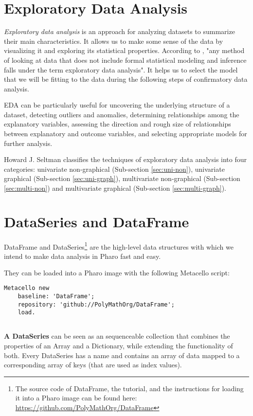 \documentclass[sigplan]{acmart}
\begin{document}
\section{Exploratory Data Analysis}
\label{sec:eda}
\textit{Exploratory data analysis} is an approach for analyzing datasets to summarize their main characteristics. It allows us to make some sense of the data by visualizing it and exploring its statistical properties.
According to \cite{Seltman}, "any method of looking at data that does not include formal statistical modeling and inference falls under the term exploratory data analysis". It helps us to select the model that we will be fitting to the data during the following steps of confirmatory data analysis.

EDA can be particularly useful for uncovering the underlying structure of a dataset, detecting outliers and anomalies, determining relationships among the explanatory variables, assessing the direction and rough size of relationships between explanatory and outcome variables, and selecting appropriate models for further analysis\cite{eStats}.

Howard J. Seltman \cite{Seltman} classifies the techniques of exploratory data analysis into four categories: univariate non-graphical (Sub-section \ref{sec:uni-non}), univariate graphical (Sub-section \ref{sec:uni-graph}), multivariate non-graphical (Sub-section \ref{sec:multi-non}) and multivariate graphical (Sub-section \ref{sec:multi-graph}).

\section{DataSeries and DataFrame}
\label{sec:dataframe}
DataFrame and DataSeries\footnote{The source code of DataFrame, the tutorial, and the instructions for loading it into a Pharo image can be found here: \url{https://github.com/PolyMathOrg/DataFrame}} are the high-level data structures with which we intend to make data analysis in Pharo fast and easy.%

They can be loaded into a Pharo image with the following Metacello script:

\begin{lstlisting}[basicstyle=\small,language=Smalltalk]
Metacello new
    baseline: 'DataFrame';
    repository: 'github://PolyMathOrg/DataFrame';
    load.
    
\end{lstlisting}

\textbf{A DataSeries} can be seen as an sequenceable collection that combines the properties of an Array and a Dictionary, while extending the functionality of both. Every DataSeries has a name and contains an array of data mapped to a corresponding array of keys (that are used as index values).
\end{document}
